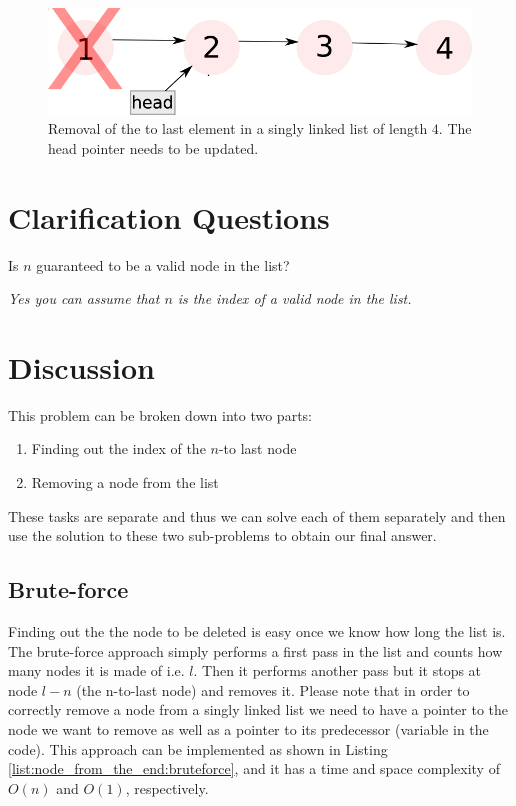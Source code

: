 \begin{figure}
	\label{fig:node_from_the_end:example2}
	\centering
	\includegraphics[scale=1.0]{sources/node_from_the_end/images/example2}
	\caption{Removal of the  to last element in a singly linked list of length $4$. The head pointer needs to be updated.}
\end{figure}


\section{Clarification Questions}

\begin{QandA}
	\item \begin{questionitem} \begin{question} Is $n$ guaranteed to be a valid node in the list?  \end{question} 	 
    \begin{answered}
		\textit{Yes you can assume that $n$ is the index of a valid node in the list.}
	\end{answered} \end{questionitem}
\end{QandA}

\section{Discussion}
\label{node_from_the_end:sec:discussion}
This problem can be broken down into two parts: 
\begin{enumerate}
	\item Finding out the index of the $n$-to last node
	\item Removing a node from the list
\end{enumerate}
These tasks are separate and thus we can solve each of them separately and then use the solution to these two sub-problems to obtain our final answer.

\subsection{Brute-force}
\label{node_from_the_end:sec:bruteforce}
Finding out the the node to be deleted is easy once we know how long the list is. The brute-force approach simply performs a first pass in the list and counts how many nodes it is made of i.e. $l$. Then it performs another pass but it stops at node $l-n$ (the n-to-last node) and removes it.
Please note that in order to correctly remove a node from a singly linked list  we need to have a pointer to the node we want to remove as well as a pointer to its predecessor (variable  in the code). This approach can be implemented as shown in Listing \ref{list:node_from_the_end:bruteforce}, and it has a time and space complexity of  $O(n)$ and $O(1)$, respectively.


